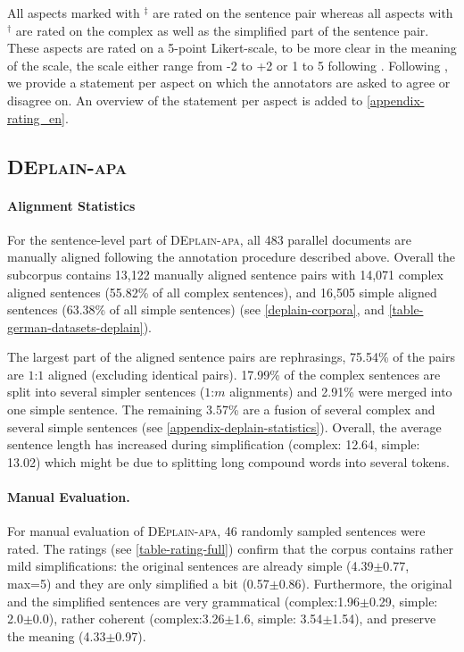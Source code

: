 \documentclass[11pt]{article}
\begin{document}
All aspects marked with $^\ddagger$ are rated on the sentence pair whereas all aspects with $^\dagger$ are rated on the complex as well as the simplified part of the sentence pair. These aspects are rated on a 5-point Likert-scale, to be more clear in the meaning of the scale, the scale either range from -2 to +2 or 1 to 5 following \citet{stodden-2021-scale-unclear}.
Following \citet{alva-manchego-etal-2020-asset,maddela-etal-2021-controllable}, we provide a statement per aspect on which the annotators are asked to agree or disagree on. An overview of the statement per aspect is added to \autoref{appendix-rating_en}. 




\subsection{\textsc{DEplain-apa}}
\label{sec-deplain-apa-sent}
\paragraph{Alignment Statistics}
For the sentence-level part of \textsc{DEplain-apa}, all 483 parallel documents are manually aligned following the annotation procedure described above. Overall the subcorpus contains 13,122 manually aligned sentence pairs with 14,071 complex aligned sentences (55.82\% of all complex sentences), and 16,505 simple aligned sentences (63.38\% of all simple sentences) (see \autoref{deplain-corpora}, and \autoref{table-german-datasets-deplain}). 


The largest part of the aligned sentence pairs are rephrasings, 75.54\% of the pairs are $1$:$1$ aligned (excluding identical pairs). 17.99\% of the complex sentences are split into several simpler sentences ($1$:$m$ alignments) and 2.91\% were merged into one simple sentence. The remaining 3.57\% are a fusion of several complex and several simple sentences (see \autoref{appendix-deplain-statistics}). Overall, the average sentence length has increased during simplification (complex: 12.64, simple: 13.02) which might be due to splitting long compound words into several tokens.


\paragraph{Manual Evaluation.}
For manual evaluation of \textsc{DEplain-apa}, 46 randomly sampled sentences were rated. The ratings (see \autoref{table-rating-full}) confirm that the corpus contains rather mild simplifications: the original sentences are already simple (4.39$\pm0.77$, max=5) and they are only simplified a bit (0.57$\pm0.86$). Furthermore, the original and the simplified sentences are very grammatical (complex:1.96$\pm$0.29, simple: 2.0$\pm$0.0), rather coherent (complex:3.26$\pm$1.6, simple: 3.54$\pm$1.54), and preserve the meaning (4.33$\pm$0.97). 
\end{document}
